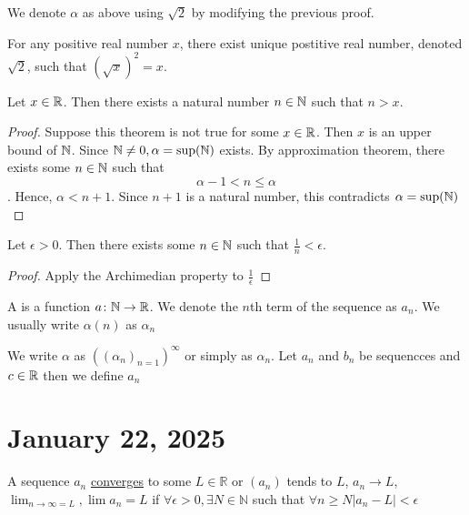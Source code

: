 \documentclass[11pt]{article}
\begin{document}
\begin{remark}
    We denote \(\alpha\) as above using \(\sqrt{2}\) by modifying the previous proof.
\end{remark}

\begin{theorem}
    For any positive real number \(x\), there exist unique postitive real number, denoted \(\sqrt{2}\), such that \((\sqrt{x})^2 = x\).
\end{theorem}

\begin{theorem}
    Let \(x \in \mathbb R\). Then there exists a natural number \(n \in \mathbb N\) such that \(n > x\).
\end{theorem}

\begin{proof}
    Suppose this theorem is not true for some \(x \in \mathbb R\). Then \(x\) is an upper bound of \(\mathbb N\). Since \(\mathbb N \neq 0, \alpha = \sup(\mathbb N)\) exists. By approximation theorem, there exists some \(n \in \mathbb N\) such that \[\alpha - 1< n \leqslant \alpha \]. Hence, \(\alpha < n +1\). Since \(n + 1\) is a natural number, this contradicts \(\alpha = \sup(\mathbb N)\)
\end{proof}
\begin{corollary}
    Let \(\epsilon > 0\). Then there exists some \(n \in \mathbb N\) such that \(\frac{1}{n} < \epsilon\).
\end{corollary}
\begin{proof}
    Apply the Archimedian property to \(\frac{1}{\epsilon}\)
\end{proof}

\begin{definition}
    A  is a function \(a \colon \mathbb N \to \mathbb R\). We denote the \(n\)th term of the sequence as \(a_n\). We usually write \(\alpha(n)\) as \(\alpha_n\)
\end{definition}

We write \(\alpha\) as \(((\alpha_n)_{n = 1})^\infty\) or simply as
\(\alpha_n\). Let \(a_n\) and \(b_n\) be sequencces and \(c \in \mathbb R\) then we
define \(a_n\)

\section{January 22, 2025}
\begin{definition}
    A sequence \(a_n\) \underline{converges} to some \(L \in \mathbb{R}\) or \((a_n)\) tends to \(L\), \(a_n \rightarrow L\), \(\lim_{n \rightarrow \infty = L}, \lim a_n = L\) if \(\forall \epsilon > 0, \exists  N \in \mathbb{N}\) such that \(\forall n \geqslant N |a_n - L| < \epsilon\)
\end{definition}
\end{document}
